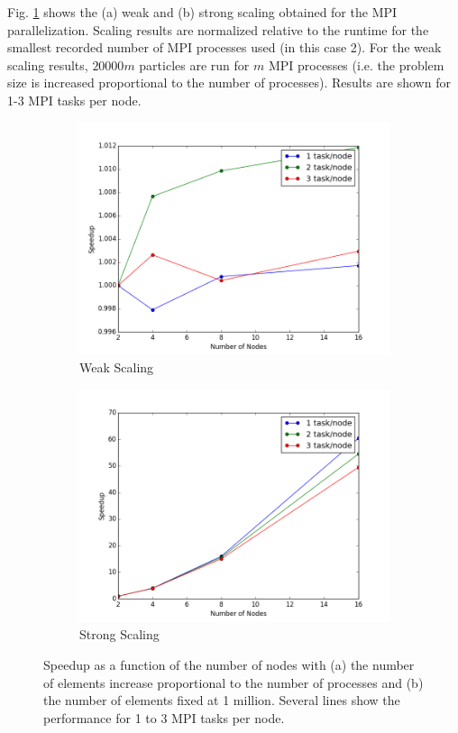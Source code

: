 \documentclass[10pt]{article}
\begin{document}
Fig. \ref{fig:scalingMPI} shows the (a) weak and (b) strong scaling obtained for the MPI parallelization. Scaling results are normalized relative to the runtime for the smallest recorded number of MPI processes used (in this case 2). For the weak scaling results, \(20000m\) particles are run for \(m\) MPI processes (i.e. the problem size is increased proportional to the number of processes). Results are shown for 1-3 MPI tasks per node. 

\begin{figure}[H]
        \centering
        \begin{subfigure}[b]{0.5\textwidth}
                \centering
                \includegraphics[width=\textwidth]{../figures/weak-mpi.png}
                \caption{Weak Scaling}
        \end{subfigure}%
                \begin{subfigure}[b]{0.5\textwidth}
                \centering
                \includegraphics[width=\textwidth]{../figures/strong-mpi.png}
                \caption{Strong Scaling}
        \end{subfigure}%
\caption{Speedup as a function of the number of nodes with (a) the number of elements increase proportional to the number of processes and (b) the number of elements fixed at 1 million. Several lines show the performance for 1 to 3 MPI tasks per node.}
        \label{fig:scalingMPI}
\end{figure}
\end{document}
